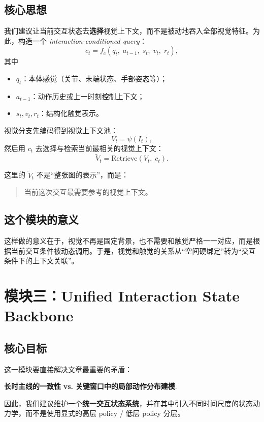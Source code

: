 \documentclass[11pt]{article}
\begin{document}
\subsection{核心思想}

我们建议让当前交互状态去\textbf{选择}视觉上下文，而不是被动地吞入全部视觉特征。为此，构造一个 \emph{interaction-conditioned query}：
\[
c_t = f_c(q_t,\; a_{t-1},\; s_t,\; v_t,\; r_t),
\]
其中
\begin{itemize}[leftmargin=2em]
    \item $q_t$：本体感觉（关节、末端状态、手部姿态等）；
    \item $a_{t-1}$：动作历史或上一时刻控制上下文；
    \item $s_t,v_t,r_t$：结构化触觉表示。
\end{itemize}

视觉分支先编码得到视觉上下文池：
\[
V_t = \psi(I_t),
\]
然后用 $c_t$ 去选择与检索当前最相关的视觉上下文：
\[
\tilde V_t = \mathrm{Retrieve}(V_t,\; c_t).
\]

这里的 $\tilde V_t$ 不是“整张图的表示”，而是：
\begin{quote}
当前这次交互最需要参考的视觉上下文。
\end{quote}

\subsection{这个模块的意义}

这样做的意义在于，视觉不再是固定背景，也不需要和触觉严格一一对应，而是根据当前交互条件被动态调用。于是，视觉和触觉的关系从“空间硬绑定”转为“交互条件下的上下文关联”。

\section{模块三：Unified Interaction State Backbone}

\subsection{核心目标}

这一模块要直接解决文章最重要的矛盾：

\begin{center}
\textbf{长时主线的一致性} \quad \textbf{vs.} \quad \textbf{关键窗口中的局部动作分布建模}.
\end{center}

因此，我们建议维护一个\textbf{统一交互状态系统}，并在其中引入不同时间尺度的状态动力学，而不是使用显式的高层 policy / 低层 policy 分层。
\end{document}
